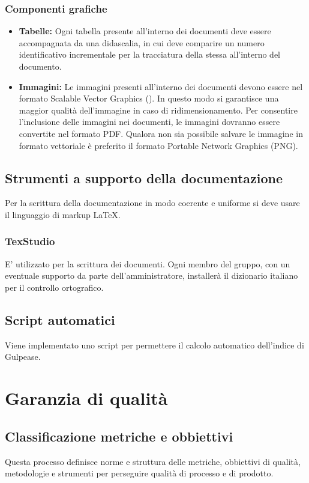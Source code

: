 \subsubsection{Componenti grafiche}
	\begin{itemize}
	\item \textbf{Tabelle:} 
	Ogni tabella presente all'interno dei documenti deve essere accompagnata da una didascalia,	in cui deve comparire un numero identificativo incrementale per la tracciatura della stessa all'interno del documento.
	\item \textbf{Immagini:}
	Le immagini presenti all'interno dei documenti devono essere nel formato Scalable Vector Graphics (). In questo modo si garantisce una maggior qualità dell'immagine in caso di ridimensionamento. Per consentire l’inclusione delle immagini nei documenti,
	le immagini dovranno essere convertite nel formato PDF. Qualora non sia possibile
	salvare le immagine in formato vettoriale è preferito il formato Portable Network
	Graphics (PNG).
	\end{itemize}
\subsection{Strumenti a supporto della documentazione}
Per la scrittura della documentazione in modo coerente e uniforme si deve usare il linguaggio di markup \LaTeX.
\subsubsection{TexStudio}
E' utilizzato per la scrittura dei documenti. Ogni membro del gruppo, con un eventuale supporto da parte dell'amministratore, installerà il dizionario italiano per il controllo ortografico.
\subsection{Script automatici}
Viene implementato uno script per permettere il calcolo automatico dell'indice di Gulpease.

\section{Garanzia di qualità}
\subsection{Classificazione metriche e obbiettivi}
Questa processo definisce norme e struttura delle metriche, obbiettivi di qualità, metodologie e strumenti per perseguire qualità di processo e di prodotto. 
